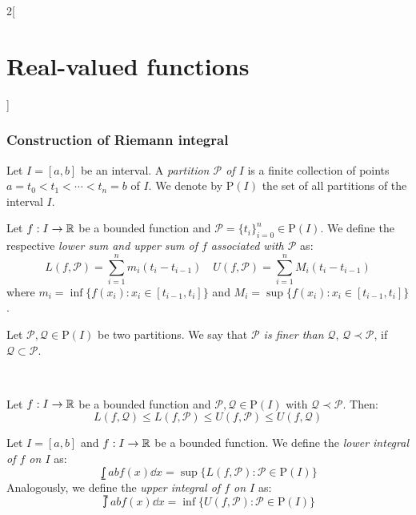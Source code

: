 \documentclass[../../../main.tex]{subfiles}
\begin{document}
\begin{multicols}{2}[\section{Real-valued functions}]
  \subsubsection{Construction of Riemann integral}
  \begin{definition}
    Let $I=[a,b]$ be an interval. A \textit{partition $\mathcal{P}$ of $I$} is a finite collection of points $a=t_0<t_1<\cdots<t_n=b$ of $I$. We denote by $\mathrm{P}(I)$ the set of all partitions of the interval $I$.
  \end{definition}
  \begin{definition}
    Let $f:I\rightarrow\mathbb{R}$ be a bounded function and $\mathcal{P}=\{t_i\}_{i=0}^n\in\mathrm{P}(I)$. We define the respective \textit{lower sum and upper sum of $f$ associated with $\mathcal{P}$} as:
    $$L(f,\mathcal{P})=\sum_{i=1}^nm_i(t_i-t_{i-1})\quad U(f,\mathcal{P})=\sum_{i=1}^nM_i(t_i-t_{i-1})$$
    where $m_i=\inf\{f(x_i):x_i\in[t_{i-1},t_i]\}$ and $M_i=\sup\{f(x_i):x_i\in[t_{i-1},t_i]\}$.
  \end{definition}
  \begin{definition}
    Let $\mathcal{P},\mathcal{Q}\in\mathrm{P}(I)$ be two partitions. We say that \textit{$\mathcal{P}$ is finer than $\mathcal{Q}$}, $\mathcal{Q}\prec\mathcal{P}$, if $\mathcal{Q}\subset\mathcal{P}$.
  \end{definition}
  \begin{center}
    \begin{minipage}{\linewidth}
      \centering
      \\
      
    \end{minipage}
  \end{center}
  \begin{prop}
    Let $f:I\rightarrow\mathbb{R}$ be a bounded function and $\mathcal{P},\mathcal{Q}\in\mathrm{P}(I)$ with $\mathcal{Q}\prec\mathcal{P}$. Then: $$L(f,\mathcal{Q})\leq L(f,\mathcal{P})\leq U(f,\mathcal{P})\leq U(f,\mathcal{Q})$$
  \end{prop}
  \begin{definition}
    Let $I=[a,b]$ and $f:I\rightarrow\mathbb{R}$ be a bounded function. We define the \textit{lower integral of $f$ on $I$} as: $$\lowint{a}{b}f(x)\dd x=\sup\{L(f,\mathcal{P}):\mathcal{P}\in\mathrm{P}(I)\}$$ Analogously, we define the \textit{upper integral of $f$ on $I$} as: $$\upint{a}{b}f(x)\dd x=\inf\{U(f,\mathcal{P}):\mathcal{P}\in\mathrm{P}(I)\}$$

\end{definition}
\end{multicols}
\end{document}

